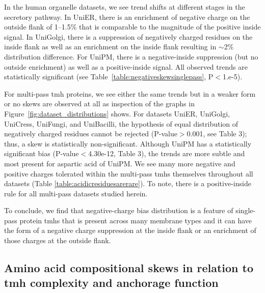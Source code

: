 In the human organelle datasets, we see trend shifts at different stages in the secretory pathway.
In UniER, there is an enrichment of negative charge on the outside flank of 1--1.5\% that is comparable to the magnitude of the positive inside signal.
In UniGolgi, there is a suppression of negatively charged residues on the inside flank as well as an enrichment on the inside flank resulting in \(\sim\)2\% distribution difference.
For UniPM, there is a negative-inside suppression (but no outside enrichment) as well as a positive-inside signal.
All observed trends are statistically significant (see Table~\ref{table:negativeskewsinglepass}, P$<$1.e-5).

For multi-pass \gls{tmh} proteins, we see either the same trends but in a weaker form or no skews are observed at all as inspection of the graphs in Figure~\ref{fig:dataset_distributions} shows.
For datasets UniER, UniGolgi, UniCress, UniFungi, and UniBacilli, the hypothesis of equal distribution of negatively charged residues cannot be rejected (P-value$>$0.001, see Table 3); thus, a skew is statistically non-significant.
Although UniPM has a statistically significant bias (P-value$<$4.30e-12, Table 3), the trends are more subtle and most present for aspartic acid of UniPM\@.
We see many more negative and positive charges tolerated within the multi-pass \gls{tmh}s themselves throughout all datasets (Table \ref{table:acidicresiduesarerare}).
To note, there is a positive-inside rule for all multi-pass datasets studied herein.

To conclude, we find that negative-charge bias distribution is a feature of single-pass protein \gls{tmh}s that is present across many membrane types and it can have the form of a negative charge suppression at the inside flank or an enrichment of those charges at the outside flank.

\subsection{Amino acid compositional skews in relation to \gls{tmh} complexity and anchorage function}

